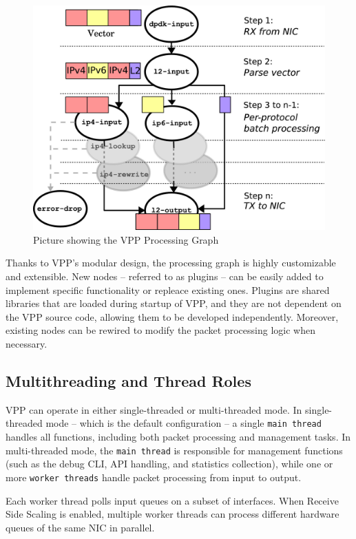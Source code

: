 \begin{figure}[!htbp]
    \centering
    \includegraphics[width=0.85\linewidth]{images/processing-graph.jpg}
    \caption{Picture showing the VPP Processing Graph~\cite{LINGUAGLOSSA}}
    \label{fig:processing-graph}
\end{figure}

Thanks to VPP's modular design, the processing graph is highly customizable and extensible. 
New nodes -- referred to as plugins -- can be easily added to implement specific functionality or repleace existing ones. 
Plugins are shared libraries that are loaded during startup of VPP, and they are not dependent on the VPP source code, allowing them to be developed independently. 
Moreover, existing nodes can be rewired to modify the packet processing logic when necessary.~\cite{LINGUAGLOSSA, DR:COMMAG-18, fdio_vpp_extensible_2021}

\subsection{Multithreading and Thread Roles}
VPP can operate in either single-threaded or multi-threaded mode. In single-threaded mode -- which is the default configuration -- a single \texttt{main thread} handles all functions, 
including both packet processing and management tasks.  
In multi-threaded mode, the \texttt{main thread} is responsible for management functions (such as the debug CLI, API handling, and statistics collection), 
while one or more \texttt{worker threads} handle packet processing from input to output.  

Each worker thread polls input queues on a subset of interfaces. 
When Receive Side Scaling is enabled, multiple worker threads can process different hardware queues of the same NIC in parallel.~\cite{fdio-multithreading}


